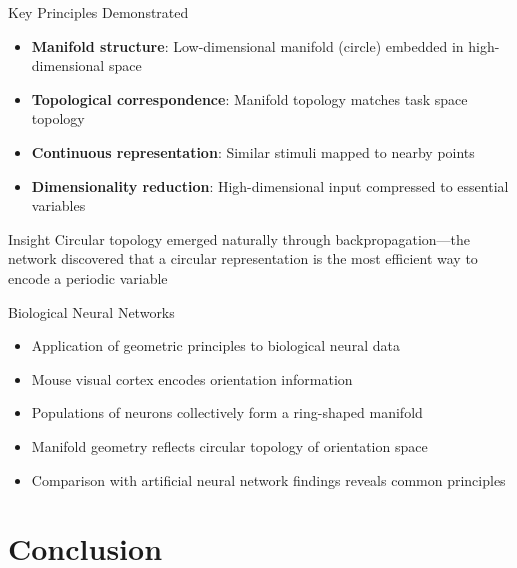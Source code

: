\documentclass[aspectratio=169]{beamer}
\begin{document}
\begin{frame}{Key Principles Demonstrated}
    \begin{itemize}
        \item \textbf{Manifold structure}: Low-dimensional manifold (circle) embedded in high-dimensional space
        \item \textbf{Topological correspondence}: Manifold topology matches task space topology
        \item \textbf{Continuous representation}: Similar stimuli mapped to nearby points
        \item \textbf{Dimensionality reduction}: High-dimensional input compressed to essential variables
    \end{itemize}
    \vspace{0.5cm}
    \begin{block}{Insight}
        Circular topology emerged naturally through backpropagation—the network discovered that a circular representation is the most efficient way to encode a periodic variable
    \end{block}
\end{frame}

\begin{frame}{Biological Neural Networks}
    \begin{itemize}
        \item Application of geometric principles to biological neural data
        \item Mouse visual cortex encodes orientation information
        \item Populations of neurons collectively form a ring-shaped manifold
        \item Manifold geometry reflects circular topology of orientation space
        \item Comparison with artificial neural network findings reveals common principles
    \end{itemize}
\end{frame}

\section{Conclusion}
\end{document}
